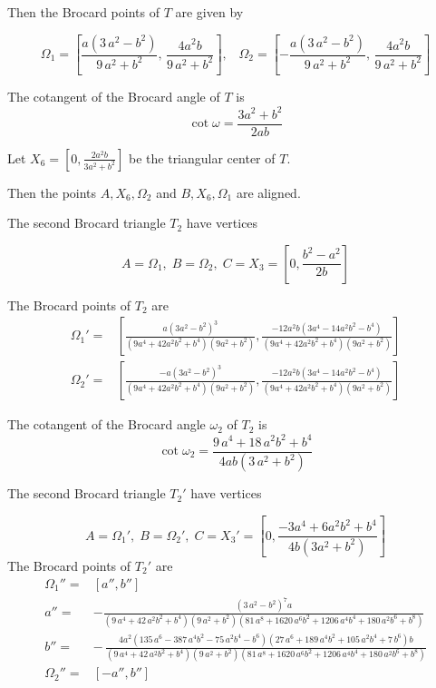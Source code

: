 Then the Brocard points of $T$ are given by

\[\Omega_1=\left[   \frac{  a( 3\,a^{2}-b^{2})}{9\,a^{2}+b^{2}}, \, \frac {4{a}^{2}b
}{9\,{a}^{2}+{b}^{2}}
\right],  \;\;\;\Omega_2=\left[ - {\frac{  a( 3\,a^{2}-b^{2})}{9\,{a}^{2}+{b}^{2}}}, \,{\frac {4{a}^{2}b
}{9\,{a}^{2}+{b}^{2}}}
\right] \]

The cotangent of the Brocard angle of $T$ is
\[\cot\omega=\frac{3a^2+b^2}{2ab}\]

Let $X_6=\left[ 0,\frac{ 2 a^2b}{ 3 a^2+b^2}\right]$ be the triangular center of $T$.

Then the points $A, X_6, \Omega_2$ and $B, X_6, \Omega_1$ are aligned.



The second Brocard triangle $T_2$ have vertices

\[ A=\Omega_1, \; B=\Omega_2, \; C=X_3=\left[0,\frac{b^2-a^2}{2b}\right]\]

The Brocard points of $T_2$ are 
\begin{align*}
\Omega_1'=&\left[  \frac{ a(3 a^2-b^2)^3}{(9 a^4+42 a^2 b^2+b^4) (9 a^2+b^2)}, \frac{-12 a^2 b (3 a^4-14 a^2 b^2-b^4)}{(9 a^4+42 a^2 b^2+b^4) (9 a^2+b^2)}\right]\\
 \Omega_2'=&\left[  \frac{-a(3 a^2-b^2)^3}{(9 a^4+42 a^2 b^2+b^4) (9 a^2+b^2)}, \frac{-12 a^2 b (3 a^4-14 a^2 b^2-b^4)}{(9 a^4+42 a^2 b^2+b^4) (9 a^2+b^2)}   \right]
\end{align*}


The cotangent of the Brocard angle $\omega_2$ of $T_2$ is
\[\cot\omega_2= 
 \frac {9\,{a}^{4}+18\,{a}^{2}{b}^{2}+{b}^{4}}{4ab \left( 3\,{a}^{
2}+{b}^{2} \right) }\]


The second Brocard triangle $T_2'$ have vertices

\[ A=\Omega_1', \; B=\Omega_2', \; C=X_3'=\left[0,\frac{-3 a^4+6a^2b^2+b^4}{4b(3a^2+b^2)} \right]\]
The Brocard points of $T_2'$ are 
\begin{align*}
\Omega_1''=&\left[a''  ,b'' \right]\\
a''=& -{\frac { \left( 3\,{a}^{2}-{b}^{2} \right) ^{7}a}{ \left( 9\,{a}^{4}+
42\,{a}^{2}{b}^{2}+{b}^{4} \right)  \left( 9\,{a}^{2}+{b}^{2} \right) 
 \left( 81\,{a}^{8}+1620\,{a}^{6}{b}^{2}+1206\,{a}^{4}{b}^{4}+180\,{a}
^{2}{b}^{6}+{b}^{8} \right) }}\\
b''=&- \,{\frac { 4{a}^{2} \left( 135\,{a}^{6}-387\,{a}^{4}{b}^{2}-75\,{a}^{2
}{b}^{4}-{b}^{6} \right)  \left( 27\,{a}^{6}+189\,{a}^{4}{b}^{2}+105\,
{a}^{2}{b}^{4}+7\,{b}^{6} \right) b}{ \left( 9\,{a}^{4}+42\,{a}^{2}{b}
^{2}+{b}^{4} \right)  \left( 9\,{a}^{2}+{b}^{2} \right)  \left( 81\,{a
}^{8}+1620\,{a}^{6}{b}^{2}+1206\,{a}^{4}{b}^{4}+180\,{a}^{2}{b}^{6}+{b
}^{8} \right) }}
\\
\Omega_2''=&\left[ -a''  ,b''
 \right]
\end{align*}



